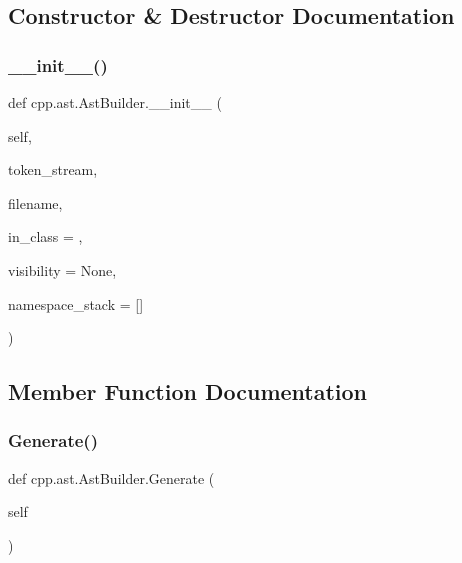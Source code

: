 \subsection{Constructor \& Destructor Documentation}
\mbox{\label{classcpp_1_1ast_1_1_ast_builder_aaf35e2f9d395c99a38e6bb6f9b5dd047}} 
\subsubsection{\texorpdfstring{\+\_\+\+\_\+init\+\_\+\+\_\+()}{\_\_init\_\_()}}
{\footnotesize\ttfamily def cpp.\+ast.\+Ast\+Builder.\+\_\+\+\_\+init\+\_\+\+\_\+ (\begin{DoxyParamCaption}\item[{}]{self,  }\item[{}]{token\+\_\+stream,  }\item[{}]{filename,  }\item[{}]{in\+\_\+class = {\ttfamily \textquotesingle{}\textquotesingle{}},  }\item[{}]{visibility = {\ttfamily None},  }\item[{}]{namespace\+\_\+stack = {\ttfamily \mbox{[}\mbox{]}} }\end{DoxyParamCaption})}



\subsection{Member Function Documentation}
\mbox{\label{classcpp_1_1ast_1_1_ast_builder_aebd0392eee56def849468af5b93b720a}} 
\subsubsection{\texorpdfstring{Generate()}{Generate()}}
{\footnotesize\ttfamily def cpp.\+ast.\+Ast\+Builder.\+Generate (\begin{DoxyParamCaption}\item[{}]{self }\end{DoxyParamCaption})}

